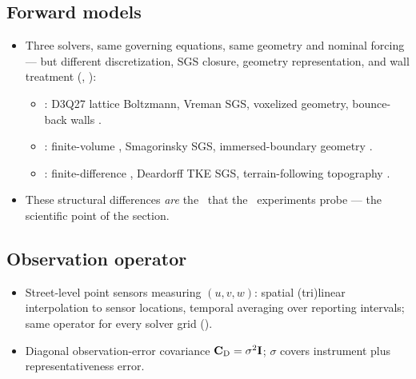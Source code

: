 \subsection{Forward models}\label{sec:forward}
\begin{itemize}
  \item Three solvers, same governing equations, same geometry and nominal
        forcing --- but different discretization, SGS closure, geometry
        representation, and wall treatment
        (, ):
        \begin{itemize}
          \item \lbmmodel: D3Q27 lattice Boltzmann, Vreman SGS, voxelized
                geometry, bounce-back walls \cite{chen1998lattice,vreman2004eddy}.
          \item \pyudales: finite-volume \les, Smagorinsky SGS,
                immersed-boundary geometry \cite{grylls2021udales,smagorinsky1963general}.
          \item \pypalm: finite-difference \les, Deardorff TKE SGS,
                terrain-following topography \cite{maronga2020palm,deardorff1980stratocumulus}.
        \end{itemize}
  \item These structural differences \emph{are} the \discrepancy\ that the
        \crossmodel\ experiments probe --- the scientific point of the section.
\end{itemize}

\subsection{Observation operator}\label{sec:obsop}
\begin{itemize}
  \item Street-level point sensors measuring $(u,v,w)$: spatial (tri)linear
        interpolation to sensor locations, temporal averaging over reporting
        intervals; same operator for every solver grid
        ().
  \item Diagonal observation-error covariance $\mathbf{C}_{\mathrm{D}} = \sigma^2\mathbf{I}$;
        $\sigma$ covers instrument plus representativeness error.
\end{itemize}

